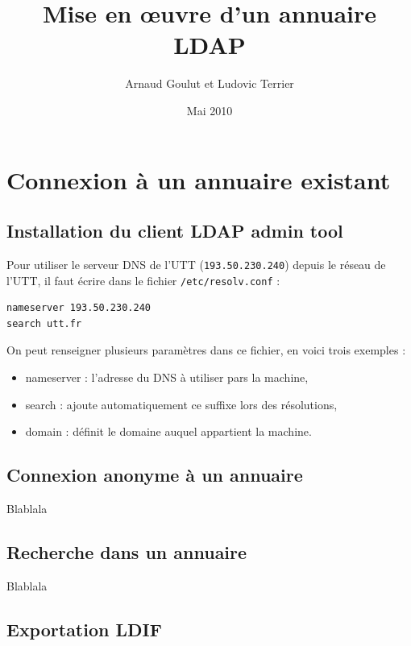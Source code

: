 \documentclass[12pt,a4paper,notitlepage]{article}
\begin{document}
\title{Mise en \oe uvre d'un annuaire LDAP}
\author{Arnaud Goulut et Ludovic Terrier}
\date{Mai 2010}
\maketitle



\thispagestyle{empty}




\section{Connexion à un annuaire existant}

\subsection{Installation du client LDAP admin tool}
Pour utiliser le serveur DNS de l'UTT (\texttt{193.50.230.240}) depuis le réseau de l'UTT, il faut écrire dans le fichier \texttt{/etc/resolv.conf} : \\

\begin{lstlisting}[title=Contenu du fichier resolv.conf]
nameserver 193.50.230.240
search utt.fr
\end{lstlisting}

\bigskip
On peut renseigner plusieurs paramètres dans ce fichier, en voici trois exemples :
\begin{itemize}
\item nameserver : l'adresse du DNS à utiliser pars la machine,
\item search : ajoute automatiquement ce suffixe lors des résolutions,
\item domain : définit le domaine auquel appartient la machine.
\end{itemize}


\subsection{Connexion anonyme à un annuaire}
Blablala

\subsection{Recherche dans un annuaire}
Blablala

\subsection{Exportation LDIF}
\end{document}
